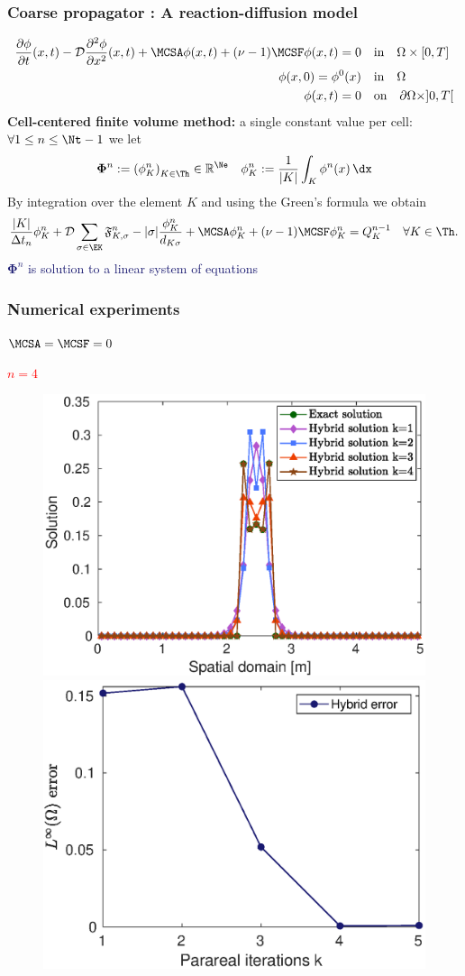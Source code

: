 \documentclass[aspectratio=169]{beamer}
\begin{document}
\begin{frame}
  \frametitle{Coarse propagator : A reaction-diffusion model}
  \begin{equation*}
    \begin{split}
  \frac{\partial \phi}{\partial t}(x,t) - \mathcal{D} \frac{\partial^2 \phi}{\partial x^2}(x,t) + \MCSA \phi(x,t) + (\nu - 1) \MCSF \phi(x,t) = 0 \quad & \text{in} \quad \Omega \times [0,T] \\
  \phi(x,0) = \phi^0(x) \quad & \text{in} \quad \Omega \\
  \phi(x,t) = 0 \quad & \text{on} \quad \partial \Omega \times ]0,T[
\end{split}
  \end{equation*}
  \textcolor{cadmiumgreen}{\textbf{Cell-centered finite volume method:}}
 a single constant value per cell: $\forall 1 \leq n \leq \Nt-1$ we let
\begin{equation*}
  {\bm \Phi}^{n} \egaldef \left(\phi_K^{n} \right)_{K \in \Th} \in \mathbb{R}^{\Ne} \quad \phi_K^n := \frac{1}{|K|} \int_{K}\phi^n(x)\,\dx
\end{equation*}
By integration over the element $K$ and using the Green's formula we obtain
\begin{equation*}
  \frac{|K|}{\Delta t_n} \phi_{K}^{n} + \mathcal{D} \sum_{\sigma \in \EK} \mathfrak{F}_{K,\sigma}^{n} -|\sigma| \frac{\phi_K^n}{d_{K \sigma}} + \MCSA \phi_{K}^{n} + (\nu-1) \MCSF \phi_{K}^{n} = Q_{K}^{n-1} \quad \forall K \in \Th.
\end{equation*}
\textcolor{midnightblue}{${\bm \Phi}^{n}$ is solution to a linear system of equations}
\end{frame}
%
\begin{frame}
  \frametitle{Numerical experiments}
  $\MCSA = \MCSF = 0$
  \\
  \vspace{0.2 cm}
  \begin{center}
    \textcolor{red}{$n=4$}
    \end{center}
  \begin{figure}
    \centering
\includegraphics[width = 0.48 \textwidth]{image/image_Boltzmann/exact_vs_hybrid_n=4}
\quad
\includegraphics[width = 0.48 \textwidth]{image/image_Boltzmann/Linf_error_n=4}
\end{figure}
\end{frame}
\end{document}
